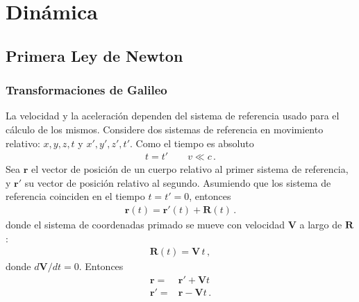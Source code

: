 \chapter{Din\'amica}
\label{cha:dinamica}

\section{Primera Ley de Newton}

\subsection{Transformaciones de Galileo}

La velocidad y la aceleraci\'on dependen del sistema de referencia usado para el c\'alculo de los mismos. Considere dos sistemas de referencia en movimiento relativo: $x,y,z,t$ y $x',y',z',t'$. Como el tiempo es absoluto
\begin{align}
  t=t'\qquad v\ll c\,.
\end{align}
Sea $\mathbf{r}$ el vector de posici\'on de un cuerpo relativo al primer sistema de referencia, y $\mathbf{r}'$ su vector de posici\'on relativo al segundo. Asumiendo que los sistema de referencia coinciden en el tiempo $t=t'=0$, entonces
\begin{align}
  \mathbf{r}(t)=\mathbf{r}'(t)+\mathbf{R}(t)\,.
\end{align}
donde el sistema de coordenadas primado se mueve con velocidad $\mathbf{V}$ a largo de $\mathbf{R}$:
\begin{align}
  \mathbf{R}(t)=\mathbf{V}\, t\,,
\end{align}
donde $d\mathbf{V}/dt=0$. Entonces
\begin{align}
  \mathbf{r}=&\mathbf{r}'+\mathbf{V}t\nonumber\\
  \mathbf{r}'=&\mathbf{r}-\mathbf{V}t\,.
\end{align}

